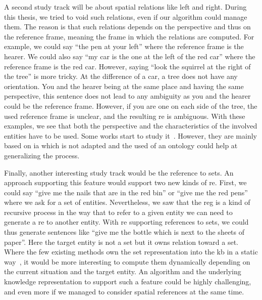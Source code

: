 A second study track will be about spatial relations like left and right. During this thesis, we tried to void such relations, even if our algorithm could manage them. The reason is that such relations depends on the perspective and thus on the reference frame, meaning the frame in which the relations are computed. For example, we could say ``the pen at your left'' where the reference frame is the hearer. We could also say ``my car is the one at the left of the red car'' where the reference frame is the red car. However, saying ``look the squirrel at the right of the tree'' is more tricky. At the difference of a car, a tree does not have any orientation. You and the hearer being at the same place and having the same perspective, this sentence does not lead to any ambiguity as you and the hearer could be the reference frame. However, if you are one on each side of the tree, the used reference frame is unclear, and the resulting \acrshort{re} is ambiguous. With these examples, we see that both the perspective and the characteristics of the involved entities have to be used. Some works start to study it~\cite{kelleher_2006_incremental, dos_2015_generating}. However, they are mainly based on \acrlong{ia} which is not adapted and the used of an ontology could help at generalizing the process.

Finally, another interesting study track would be the reference to sets. An approach supporting this feature would support two new kinds of \acrshort{re}. First, we could say ``give me the nails that are in the red bin'' or ``give me the red pens'' where we ask for a set of entities. Nevertheless, we saw that the \acrshort{reg} is a kind of recursive process in the way that to refer to a given entity we can need to generate a \acrshort{re} to another entity. With \acrshort{re} supporting references to sets, we could thus generate sentences like ``give me the bottle which is next to the sheets of paper''. Here the target entity is not a set but it owns relation toward a set. Where the few existing methods own the set representation into the \acrlong{kb} in a static way~\cite{fang_2013_towards}, it would be more interesting to compute them dynamically depending on the current situation and the target entity. An algorithm and the underlying knowledge representation to support such a feature could be highly challenging, and even more if we managed to consider spatial references at the same time.